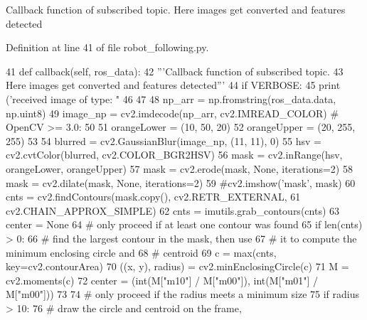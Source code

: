 \begin{DoxyVerb}Callback function of subscribed topic. 
Here images get converted and features detected\end{DoxyVerb}
 

Definition at line 41 of file robot\+\_\+following.\+py.


\begin{DoxyCode}
41     \textcolor{keyword}{def }callback(self, ros\_data):
42         \textcolor{stringliteral}{'''Callback function of subscribed topic. }
43 \textcolor{stringliteral}{        Here images get converted and features detected'''}
44         \textcolor{keywordflow}{if} VERBOSE:
45             \textcolor{keywordflow}{print} (\textcolor{stringliteral}{'received image of type: "%
46 
47         
48         np\_arr = np.fromstring(ros\_data.data, np.uint8)
49         image\_np = cv2.imdecode(np\_arr, cv2.IMREAD\_COLOR)  \textcolor{comment}{# OpenCV >= 3.0:}
50 
51         orangeLower = (10, 50, 20)
52         orangeUpper = (20, 255, 255)
53 
54         blurred = cv2.GaussianBlur(image\_np, (11, 11), 0)
55         hsv = cv2.cvtColor(blurred, cv2.COLOR\_BGR2HSV)
56         mask = cv2.inRange(hsv, orangeLower, orangeUpper)
57         mask = cv2.erode(mask, \textcolor{keywordtype}{None}, iterations=2)
58         mask = cv2.dilate(mask, \textcolor{keywordtype}{None}, iterations=2)
59         \textcolor{comment}{#cv2.imshow('mask', mask)}
60         cnts = cv2.findContours(mask.copy(), cv2.RETR\_EXTERNAL,
61                                 cv2.CHAIN\_APPROX\_SIMPLE)
62         cnts = imutils.grab\_contours(cnts)
63         center = \textcolor{keywordtype}{None}
64         \textcolor{comment}{# only proceed if at least one contour was found}
65         \textcolor{keywordflow}{if} len(cnts) > 0:
66             \textcolor{comment}{# find the largest contour in the mask, then use}
67             \textcolor{comment}{# it to compute the minimum enclosing circle and}
68             \textcolor{comment}{# centroid}
69             c = max(cnts, key=cv2.contourArea)
70             ((x, y), radius) = cv2.minEnclosingCircle(c)
71             M = cv2.moments(c)
72             center = (int(M[\textcolor{stringliteral}{"m10"}] / M[\textcolor{stringliteral}{"m00"}]), int(M[\textcolor{stringliteral}{"m01"}] / M[\textcolor{stringliteral}{"m00"}]))
73 
74             \textcolor{comment}{# only proceed if the radius meets a minimum size}
75             \textcolor{keywordflow}{if} radius > 10:
76                 \textcolor{comment}{# draw the circle and centroid on the frame,}
}
\end{DoxyCode}
